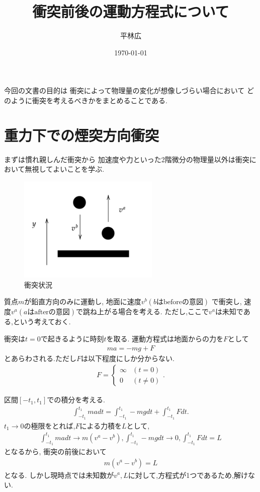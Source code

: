 \documentclass[a4paper,11pt]{jsarticle}
\begin{document}
\title{衝突前後の運動方程式について}
\author{平林広}
\date{\today}
\maketitle

今回の文書の目的は
衝突によって物理量の変化が想像しづらい場合において
どのように衝突を考えるべきかをまとめることである.

\section{重力下での煙突方向衝突}
まずは慣れ親しんだ衝突から
加速度や力といった2階微分の物理量以外は衝突において無視してよいことを学ぶ.

\begin{figure}[h]
  \centering
  \includegraphics[width = 0.6\textwidth]{ball_freefall.png}
  \caption{衝突状況}
  \label{ball_freefall.png}
\end{figure}

質点$m$が鉛直方向のみに運動し,
地面に速度$v^b (b\text{はbeforeの意図})$ で衝突し,
速度$v^a (a\text{はafterの意図})$で跳ね上がる場合を考える.
ただし,ここで$v^a$は未知である,という考えておく.

衝突は$t=0$で起きるように時刻$t$を取る.
運動方程式は地面からの力を$F$として
\begin{align*}
  m a = -mg + F
\end{align*}
とあらわされる.ただし$F$は以下程度にしか分からない.
\begin{align*}
  F = \begin{cases}
    \infty & (t = 0)
    \\
    0 & (t \neq 0)
  \end{cases}
  .
\end{align*}

区間$[-t_1, t_1]$での積分を考える.
\begin{align*}
  \int_{-t_1}^{t_1} m a dt = \int_{-t_1}^{t_1} -mg dt + \int_{-t_1}^{t_1} F dt
  .
\end{align*}
$t_1 \rightarrow 0$の極限をとれば,$F$による力積を$L$として,
\begin{gather*}
  \int_{-t_1}^{t_1} m a dt \rightarrow m(v^a - v^b),
  \int_{-t_1}^{t_1} -mg dt \rightarrow 0,
  \int_{-t_1}^{t_1} F dt = L
\end{gather*}
となるから,
衝突の前後において
\begin{gather}
  m(v^a - v^b) = L
  \label{case1:newton}
\end{gather}
となる.
しかし現時点では未知数が$v^a, L$に対して,方程式が1つであるため,解けない.
\end{document}

